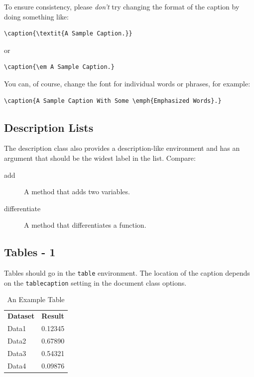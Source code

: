 \documentclass{article}
\begin{document}
To ensure consistency, please \emph{don't} try changing the format of the caption by doing
something like:
\begin{verbatim}
\caption{\textit{A Sample Caption.}}
\end{verbatim}
or
\begin{verbatim}
\caption{\em A Sample Caption.}
\end{verbatim}
You can, of course, change the font for individual words or 
phrases, for example:
\begin{verbatim}
\caption{A Sample Caption With Some \emph{Emphasized Words}.}
\end{verbatim}


\subsection{Description Lists}

The description class also provides a description-like 
environment and has an
argument that should be the widest label in the list. Compare:
\begin{description}
\item[add] A method that adds two variables.
\item[differentiate] A method that differentiates a function.
\end{description}

\subsection{Tables - 1}
\label{sec:tables}

Tables should go in the \texttt{table} environment. 
The location of the caption depends on the \verb|tablecaption|
setting in the document class options.

\begin{table}[htbp]
  {\caption{An Example Table}}%
  {\begin{tabular}{ll}
  \bfseries Dataset & \bfseries Result\\
  Data1 & 0.12345\\
  Data2 & 0.67890\\
  Data3 & 0.54321\\
  Data4 & 0.09876
  \end{tabular}}
\end{table}
\end{document}
